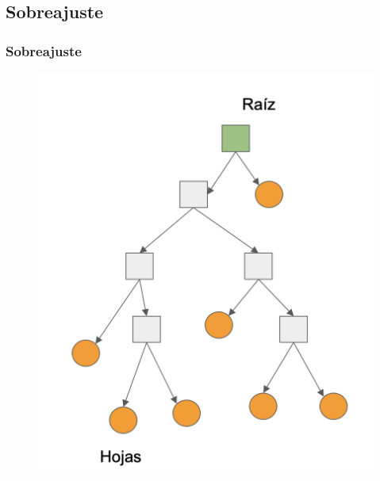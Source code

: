 \documentclass[
  shownotes,
  xcolor={svgnames},
  hyperref={colorlinks,citecolor=DarkBlue,linkcolor=andesred,urlcolor=DarkBlue}
  , aspectratio=169]{beamer}
\begin{document}
\subsection{Sobreajuste}
\begin{frame}[fragile]
\frametitle{Sobreajuste}


  
\begin{figure}[H] \centering
            \captionsetup{justification=centering}
              \includegraphics[scale=0.4]{figures/tree_uba.png}
 \end{figure}

\end{frame}
\end{document}

